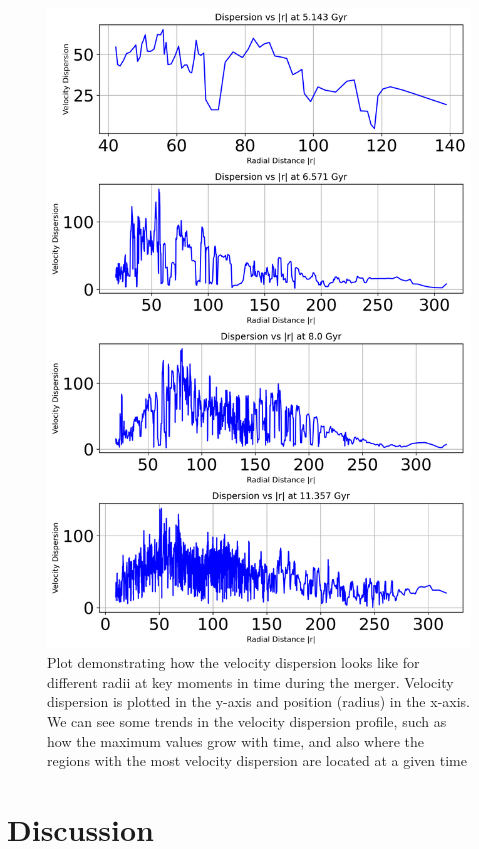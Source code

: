 \documentclass[linenumbers,trackchanges,twocolumn]{aastex7}
\begin{document}
\begin{figure}
    \centering
    \includegraphics[width=\linewidth]{dispersion_vs_radius.png}
    \caption{Plot demonstrating how the velocity dispersion looks like for different radii at key moments in time during the merger. Velocity dispersion is plotted in the y-axis and position (radius) in the x-axis. We can see some trends in the velocity dispersion profile, such as how the maximum values grow with time, and also where the regions with the most velocity dispersion are located at a given time}
    \label{fig:general4}
\end{figure}


 

\section{Discussion} \label{sec:discussion}
\end{document}
